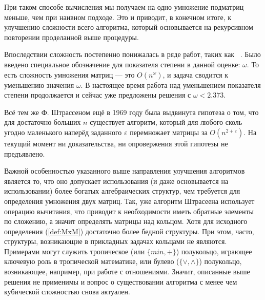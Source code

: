 При таком способе вычисления мы получаем на одно умножение подматриц меньше, чем при наивном подходе. Это и приводит, в конечном итоге, к улучшению сложности всего алгоритма, который основывается на рекурсивном повторении проделанной выше процедуры.

Впоследствии сложность постепенно понижалась в ряде работ, таких как ~. Было введено специальное обозначение для показателя степени в данной оценке: $\omega$. То есть сложность умножения матриц --- это $O(n^\omega)$, и задача сводится к уменьшению значения $\omega$. В настоящее время работа над уменьшением показателя степени продолжается и сейчас уже предложены решения с $\omega < 2.373$.

Всё тем же Ф. Штрассеном ещё в 1969 году была выдвинута гипотеза о том, что для достаточно больших $n$ существует алгоритм, который для любого сколь угодно маленького наперёд заданного $\varepsilon$ перемножает матрицы за $O(n^{2+\varepsilon})$. На текущий момент ни доказательства, ни опровержения этой гипотезы не предъявлено.

Важной особенностью указанного выше направления улучшения алгоритмов является то, что оно допускает использования (и даже основывается на использовании) более богатых алгебраических структур, чем требуется для определения умножения двух матриц. Так, уже алгоритм Штрасеена использует операцию вычитания, что приводит к необходимости иметь обратные элементы по сложению, а значит определять матрицы над кольцом. Хотя для исходного определения (\ref{def:MxM}) достаточно более бедной структуры. При этом, часто, структуры, возникающие в прикладных задачах кольцами не являются. Примерами могут служить тропическое (или $\{min,+\}$) полукольцо, играющее ключевую роль в тропической математике, или булево ($\{\vee,\wedge\}$) полукольцо, возникающее, например, при работе с отношениями. Значит, описанные выше решения не применимы и вопрос о существовании алгоритма с менее чем кубической сложностью снова актуален.

